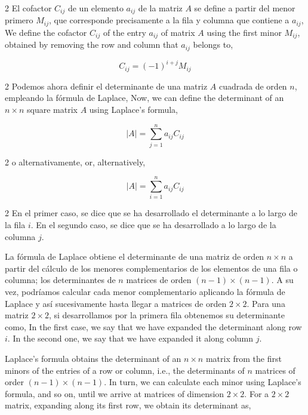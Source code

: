 \begin{paracol}{2}
 El cofactor $C_{ij}$ de un elemento $a_{ij}$ de la matriz $A$ se define a partir del menor primero $M_{ij}$, que corresponde precisamente a la fila y columna que contiene a $a_{ij}$,
 \switchcolumn
 We define the cofactor $C_{ij}$ of the entry $a_{ij}$ of matrix $A$ using the first minor $M_{ij}$, obtained by removing the row and column that $a_{ij}$ belongs to,
\end{paracol}
 
\begin{equation*}
C_{ij}=(-1)^{i+j} M_{ij}
\end{equation*}

\begin{paracol}{2}
Podemos ahora definir el determinante de una matriz $A$ cuadrada de orden $n$, empleando la fórmula de Laplace,
\switchcolumn
Now, we can define the determinant of an $n\times n$ square matrix $A$ using Laplace's formula, 
\end{paracol}
\begin{equation*}
\vert A \vert = \sum_{j=1}^n a_{ij}C_{ij}
\end{equation*}
\begin{paracol}{2}
o alternativamente,
\switchcolumn
or, alternatively,
\end{paracol}

\begin{equation*}
\vert A \vert = \sum_{i=1}^n a_{ij}C_{ij}
\end{equation*}
\begin{paracol}{2}
En el primer caso, se dice que se ha desarrollado el determinante a lo largo de la fila $i$. En el segundo caso, se dice que se ha desarrollado a lo largo de la columna $j$.

 La fórmula de Laplace obtiene el determinante de una matriz de orden $n\times n$ a partir del cálculo de los menores complementarios de los elementos de una fila o columna; los determinantes de $n$ matrices de orden $(n-1)\times (n-1)$. A su vez, podríamos calcular cada menor complementario aplicando la fórmula de Laplace y así sucesivamente hasta llegar a matrices de orden $2\times 2$. Para una matriz $2\times 2$, si desarrollamos por la primera fila obtenemos su determinante como,
\switchcolumn
In the first case, we say that we have expanded the determinant along row $i$. In the second one, we say that we have expanded it along column $j$.

Laplace's formula obtains the determinant of an $n\times n$ matrix from the first minors of the entries of a row or column, i.e., the determinants of $n$ matrices of order $(n-1)\times (n-1)$. In turn, we can calculate each minor using Laplace's formula, and so on, until we arrive at matrices of dimension $2\times 2$. For a $2\times 2$ matrix, expanding along its first row, we obtain its determinant as,      

\end{paracol}

